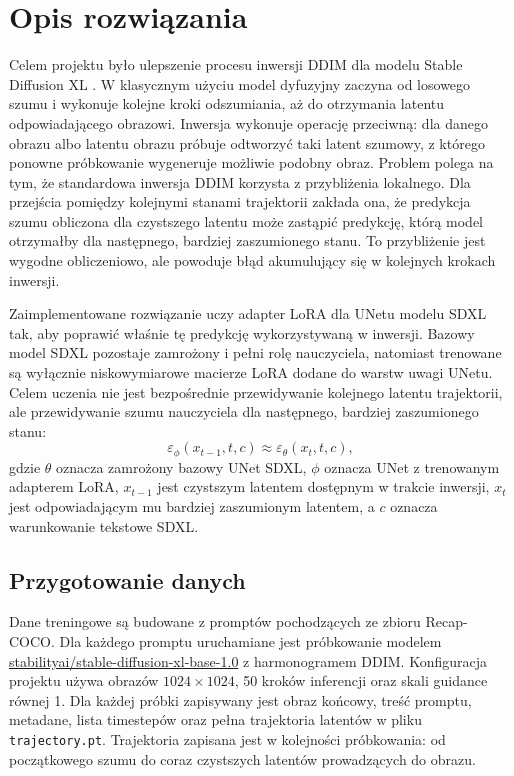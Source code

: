 \documentclass[
    left=2.5cm,
    right=2.5cm,
    top=2.5cm,
    bottom=3cm,
    bindingoffset=6mm,
    nohyphenation=false
]{szablon/eiti/sprawozdanie}
\begin{document}


\newpage
\pagestyle{headings}

\newpage
\section{Opis rozwiązania}

Celem projektu było ulepszenie procesu inwersji DDIM\cite{song2021denoising} dla modelu Stable
Diffusion XL \cite{podell2024sdxl}. W klasycznym użyciu model dyfuzyjny zaczyna od losowego
szumu i wykonuje kolejne kroki odszumiania, aż do otrzymania latentu
odpowiadającego obrazowi. Inwersja wykonuje operację przeciwną: dla danego
obrazu albo latentu obrazu próbuje odtworzyć taki latent szumowy, z którego
ponowne próbkowanie wygeneruje możliwie podobny obraz. Problem polega na
tym, że standardowa inwersja DDIM korzysta z przybliżenia lokalnego. Dla
przejścia pomiędzy kolejnymi stanami trajektorii zakłada ona, że predykcja
szumu obliczona dla czystszego latentu może zastąpić predykcję, którą model
otrzymałby dla następnego, bardziej zaszumionego stanu. To przybliżenie jest
wygodne obliczeniowo, ale powoduje błąd akumulujący się w kolejnych krokach
inwersji.

Zaimplementowane rozwiązanie uczy adapter LoRA\cite{hu2022lora} dla UNetu modelu SDXL tak,
aby poprawić właśnie tę predykcję wykorzystywaną w inwersji. Bazowy model
SDXL pozostaje zamrożony i pełni rolę nauczyciela, natomiast trenowane są
wyłącznie niskowymiarowe macierze LoRA dodane do warstw uwagi UNetu. Celem
uczenia nie jest bezpośrednie przewidywanie kolejnego latentu trajektorii,
ale przewidywanie szumu nauczyciela dla następnego, bardziej zaszumionego
stanu:
\[
    \varepsilon_{\phi}(x_{t-1}, t, c)
    \approx
    \varepsilon_{\theta}(x_t, t, c),
\]
gdzie $\theta$ oznacza zamrożony bazowy UNet SDXL, $\phi$ oznacza UNet z
trenowanym adapterem LoRA, $x_{t-1}$ jest czystszym latentem dostępnym w
trakcie inwersji, $x_t$ jest odpowiadającym mu bardziej zaszumionym latentem,
a $c$ oznacza warunkowanie tekstowe SDXL.

\subsection{Przygotowanie danych}

Dane treningowe są budowane z promptów pochodzących ze zbioru Recap-COCO\cite{li2025what}.
Dla każdego promptu uruchamiane jest próbkowanie modelem 
\url{stabilityai/stable-diffusion-xl-base-1.0} z harmonogramem DDIM.
Konfiguracja projektu używa obrazów $1024 \times 1024$, 50 kroków
inferencji oraz skali guidance\cite{DBLP:journals/corr/abs-2207-12598} równej 1. Dla każdej próbki zapisywany jest
obraz końcowy, treść promptu, metadane, lista timestepów oraz pełna
trajektoria latentów w pliku \texttt{trajectory.pt}. Trajektoria zapisana
jest w kolejności próbkowania: od początkowego szumu do coraz czystszych
latentów prowadzących do obrazu.
\end{document}
